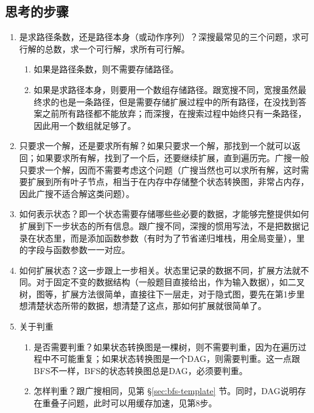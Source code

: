 \subsection{思考的步骤}
\begin{enumerate}
\item 是求路径条数，还是路径本身（或动作序列）？深搜最常见的三个问题，求可行解的总数，求一个可行解，求所有可行解。
    \begin{enumerate}
	\item 如果是路径条数，则不需要存储路径。
    \item 如果是求路径本身，则要用一个数组存储路径。跟宽搜不同，宽搜虽然最终求的也是一条路径，但是需要存储扩展过程中的所有路径，在没找到答案之前所有路径都不能放弃；而深搜，在搜索过程中始终只有一条路径，因此用一个数组就足够了。
    \end{enumerate}

\item 只要求一个解，还是要求所有解？如果只要求一个解，那找到一个就可以返回；如果要求所有解，找到了一个后，还要继续扩展，直到遍历完。广搜一般只要求一个解，因而不需要考虑这个问题（广搜当然也可以求所有解，这时需要扩展到所有叶子节点，相当于在内存中存储整个状态转换图，非常占内存，因此广搜不适合解这类问题）。

\item 如何表示状态？即一个状态需要存储哪些些必要的数据，才能够完整提供如何扩展到下一步状态的所有信息。跟广搜不同，深搜的惯用写法，不是把数据记录在状态里，而是添加函数参数（有时为了节省递归堆栈，用全局变量），里的字段与函数参数一一对应。

\item 如何扩展状态？这一步跟上一步相关。状态里记录的数据不同，扩展方法就不同。对于固定不变的数据结构（一般题目直接给出，作为输入数据），如二叉树，图等，扩展方法很简单，直接往下一层走，对于隐式图，要先在第1步里想清楚状态所带的数据，想清楚了这点，那如何扩展就很简单了。

\item 关于判重
    \begin{enumerate}
    \item 是否需要判重？如果状态转换图是一棵树，则不需要判重，因为在遍历过程中不可能重复；如果状态转换图是一个DAG，则需要判重。这一点跟BFS不一样，BFS的状态转换图总是DAG，必须要判重。
    \item 怎样判重？跟广搜相同，见第 \S \ref{sec:bfs-template} 节。同时，DAG说明存在重叠子问题，此时可以用缓存加速，见第8步。
    \end{enumerate}


\end{enumerate}
